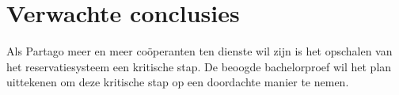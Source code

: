 \section{Verwachte conclusies}
\label{sec:verwachte_conclusies}
Als Partago meer en meer coöperanten ten dienste wil zijn is het opschalen van het reservatiesysteem een kritische stap. De beoogde bachelorproef wil het plan uittekenen om deze kritische stap op een doordachte manier te nemen.  
